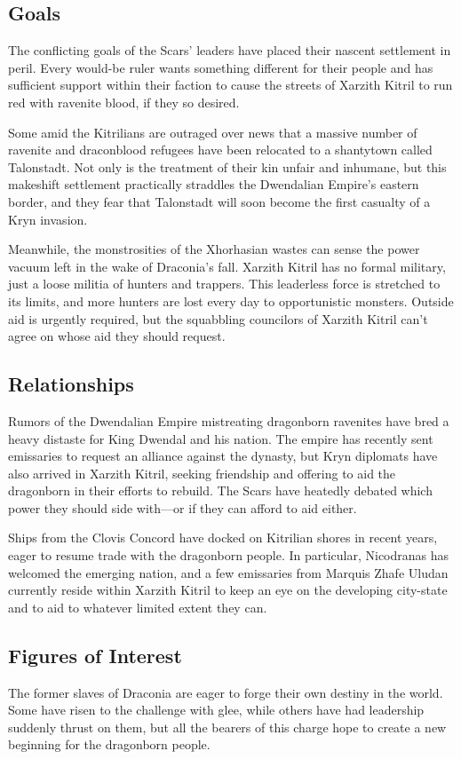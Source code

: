 \documentclass[10pt,a4paper,twoside,bg=print,twocolumn,openany,nodeprecatedcode]{dndbook}
\begin{document}
\subsection{Goals}
The conflicting goals of the Scars' leaders have placed their nascent settlement in peril. Every would-be ruler wants something different for their people and has sufficient support within their faction to cause the streets of Xarzith Kitril to run red with ravenite blood, if they so desired.

Some amid the Kitrilians are outraged over news that a massive number of ravenite and draconblood refugees have been relocated to a shantytown called Talonstadt. Not only is the treatment of their kin unfair and inhumane, but this makeshift settlement practically straddles the Dwendalian Empire's eastern border, and they fear that Talonstadt will soon become the first casualty of a Kryn invasion.

Meanwhile, the monstrosities of the Xhorhasian wastes can sense the power vacuum left in the wake of Draconia's fall. Xarzith Kitril has no formal military, just a loose militia of hunters and trappers. This leaderless force is stretched to its limits, and more hunters are lost every day to opportunistic monsters. Outside aid is urgently required, but the squabbling councilors of Xarzith Kitril can't agree on whose aid they should request.

\subsection{Relationships}
Rumors of the Dwendalian Empire mistreating dragonborn ravenites have bred a heavy distaste for King Dwendal and his nation. The empire has recently sent emissaries to request an alliance against the dynasty, but Kryn diplomats have also arrived in Xarzith Kitril, seeking friendship and offering to aid the dragonborn in their efforts to rebuild. The Scars have heatedly debated which power they should side with—or if they can afford to aid either.

Ships from the Clovis Concord have docked on Kitrilian shores in recent years, eager to resume trade with the dragonborn people. In particular, Nicodranas has welcomed the emerging nation, and a few emissaries from Marquis Zhafe Uludan currently reside within Xarzith Kitril to keep an eye on the developing city-state and to aid to whatever limited extent they can.

\subsection{Figures of Interest}
The former slaves of Draconia are eager to forge their own destiny in the world. Some have risen to the challenge with glee, while others have had leadership suddenly thrust on them, but all the bearers of this charge hope to create a new beginning for the dragonborn people.
\end{document}
